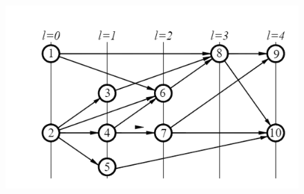 \documentclass[fleqn, 12pt]{article}
\theoremstyle{definition}
\begin{document}
\begin{figure} [htp!]
\includegraphics[width = \linewidth]{Pics/Discrete math/ex8/ex8-task4-1.png}
\end{figure}

\newpage
\end{document}

